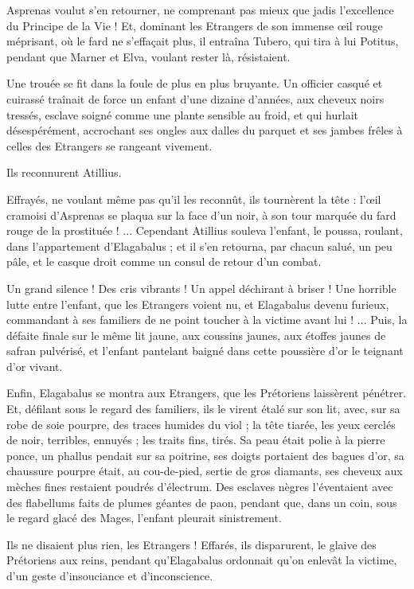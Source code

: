 \documentclass[a4paper, 11pt, oneside, polutonikogreek, french]{article}
\begin{document}
Asprenas voulut s'en retourner, ne comprenant pas mieux que jadis l'excellence du Principe de la Vie ! Et, dominant les Etrangers de son immense œil rouge méprisant, où le fard ne s'effaçait plus, il entraîna Tubero, qui tira à lui Potitus, pendant que Marner et Elva, voulant rester là, résistaient.

Une trouée se fit dans la foule de plus en plus bruyante. Un officier casqué et cuirassé traînait de force un enfant d'une dizaine d'années, aux cheveux noirs tressés, esclave soigné comme une plante sensible au froid, et qui hurlait désespérément, accrochant ses ongles aux dalles du parquet et ses jambes frêles à celles des Etrangers se rangeant vivement.

Ils reconnurent Atillius.

Effrayés, ne voulant même pas qu'il les reconnût, ils tournèrent la tête : l'œil cramoisi d'Asprenas se plaqua sur la face d'un noir, à son tour marquée du fard rouge de la prostituée ! ... Cependant Atillius souleva l'enfant, le poussa, roulant, dans l'appartement d'Elagabalus ; et il s'en retourna, par chacun salué, un peu pâle, et le casque droit comme un consul de retour d'un combat.

Un grand silence ! Des cris vibrants ! Un appel déchirant à briser ! Une horrible lutte entre l'enfant, que les Etrangers voient nu, et Elagabalus devenu furieux, commandant à ses familiers de ne point toucher à la victime avant lui ! ... Puis, la défaite finale sur le même lit jaune, aux coussins jaunes, aux étoffes jaunes de safran pulvérisé, et l'enfant pantelant baigné dans cette poussière d'or le teignant d'or vivant.

Enfin, Elagabalus se montra aux Etrangers, que les Prétoriens laissèrent pénétrer. Et, défilant sous le regard des familiers, ils le virent étalé sur son lit, avec, sur sa robe de soie pourpre, des traces humides du viol ; la tête tiarée, les yeux cerclés de noir, terribles, ennuyés ; les traits fins, tirés. Sa peau était polie à la pierre ponce, un phallus pendait sur sa poitrine, ses doigts portaient des bagues d'or, sa chaussure pourpre était, au cou-de-pied, sertie de gros diamants, ses cheveux aux mèches fines restaient poudrés d'électrum. Des esclaves nègres l'éventaient avec des flabellums faits de plumes géantes de paon, pendant que, dans un coin, sous le regard glacé des Mages, l'enfant pleurait sinistrement.

Ils ne disaient plus rien, les Etrangers ! Effarés, ils disparurent, le glaive des Prétoriens aux reins, pendant qu'Elagabalus ordonnait qu'on enlevât la victime, d'un geste d'insouciance et d'inconscience.
\end{document}
